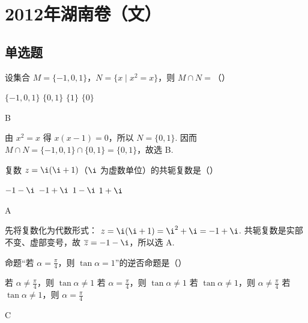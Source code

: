 \chapter{2012年湖南卷（文）}

\section{单选题}

\begin{problem}
设集合 \(M = \{-1, 0, 1\}\)，\(N = \{x \mid x^2 = x\}\)，则 \(M \cap N =\)（\quad）

\choices
    {\( \{-1,0,1\} \)}
    {\(\{0, 1\}\)}
    {\( \{1\} \)}
    {\( \{0\} \)}
\end{problem}

\begin{answer}
B
\end{answer}

\begin{solution}
由 \(x^2=x\) 得 \(x(x-1)=0\)，所以 \(N=\{0,1\}\). 因而
\(M\cap N=\{-1,0,1\}\cap\{0,1\}=\{0,1\}\)，故选 B.
\end{solution}

\begin{problem}
复数 \(z = \i(\i + 1)\)（\(\i\) 为虚数单位）的共轭复数是（\quad）

\choices
    {\(-1 - \i\)}
    {\(-1 + \i\)}
    {\(1 - \i\)}
    {\(1 + \i\)}
\end{problem}

\begin{answer}
A
\end{answer}

\begin{solution}
先将复数化为代数形式：
\(z=\i(\i+1)=\i^2+\i=-1+\i\). 共轭复数是实部不变、虚部变号，故
\(\overline z=-1-\i\)，所以选 A.
\end{solution}

\begin{problem}
命题“若 \(\alpha = \frac{\pi}{4}\)，则 \(\tan \alpha = 1\)”的逆否命题是（\quad）

\choices
    {若 \(\alpha \neq \frac{\pi}{4}\)，则 \(\tan \alpha \neq 1\)}
    {若 \(\alpha = \frac{\pi}{4}\)，则 \(\tan \alpha \neq 1\)}
    {若 \(\tan \alpha \neq 1\)，则 \(\alpha \neq \frac{\pi}{4}\)}
    {若 \(\tan \alpha \neq 1\)，则 \(\alpha = \frac{\pi}{4}\)}
\end{problem}

\begin{answer}
C
\end{answer}

